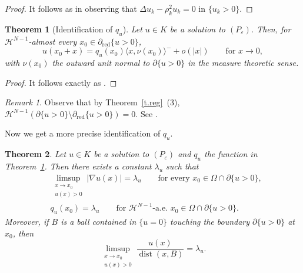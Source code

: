 \documentclass[11pt]{amsart}
\newtheorem{theorem}{Theorem}[section]
\theoremstyle{definition}
\theoremstyle{remark}
\newtheorem{remark}{Remark}[section]
\numberwithin{equation}{section}
\newcommand{\cH}{\mathcal{H}}
\DeclareMathOperator{\dist}{dist}
\newcommand{\red}{\mathrm{red}}
\begin{document}
\begin{proof}
It follows as in \cite[Section~4.7]{AC} observing that $\Delta u_k-\rho_k^2u_k=0$ in $\{u_k>0\}$.
\end{proof}

\begin{theorem}[Identification of $q_u$]\label{t.ident}
Let $u\in K$ be a solution to $(P_\varepsilon)$. Then, for $\cH^{N-1}$-almost every $x_0\in\partial_\red\{u>0\}$,
\[
u(x_0+x)=q_u(x_0)\langle x,\nu(x_0)\rangle^-+o(|x|)\qquad\text{for }x\to0,
\]
with $\nu(x_0)$ the outward unit normal to $\partial\{u>0\}$ in the measure theoretic sense.
\end{theorem}

\begin{proof}
It follows exactly as \cite[Theorem~4.8 and Remark~4.9]{AC}.
\end{proof}

\begin{remark}\label{r.redfull}
Observe that by Theorem~\ref{t.reg}~(3), $\cH^{N-1}(\partial\{u>0\}\setminus\partial_\red\{u>0\})=0$. See \cite{Fe}.
\end{remark}

Now we get a more precise identification of $q_u$.

\begin{theorem}\label{t.const}
Let $u\in K$ be a solution to $(P_\varepsilon)$ and $q_u$ the function in Theorem~\ref{t.ident}. Then there exists a constant $\lambda_u$ such that
\begin{align}
&\limsup_{\substack{x\to x_0\\u(x)>0}}|\nabla u(x)|=\lambda_u\qquad\text{for every } x_0\in\Omega\cap\partial\{u>0\},\label{214}\\
&q_u(x_0)=\lambda_u\qquad\text{for } \cH^{N-1}\text{-a.e. } x_0\in\Omega\cap\partial\{u>0\}.\label{215}
\end{align}
Moreover, if $B$ is a ball contained in $\{u=0\}$ touching the boundary $\partial\{u>0\}$ at $x_0$, then
\begin{equation}\label{216}
\limsup_{\substack{x\to x_0\\u(x)>0}}\frac{u(x)}{\dist(x,B)}=\lambda_u.
\end{equation}
\end{theorem}
\end{document}
